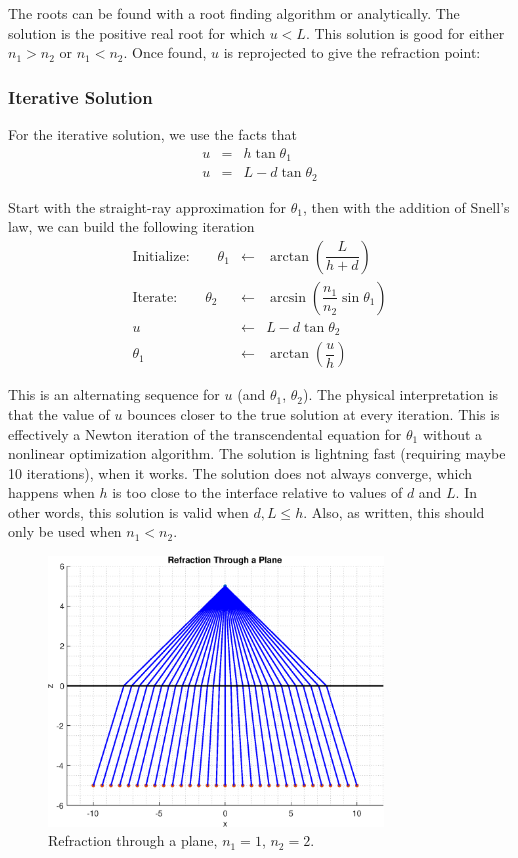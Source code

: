 The roots can be found with a root finding algorithm or analytically. The solution is the positive real root for which $u < L$.  This solution is good for either $n_1 > n_2$ or $n_1 < n_2$. Once found, $u$ is reprojected to give the refraction point: 

\subsubsection{Iterative Solution}
For the iterative solution, we use the facts that  
\begin{eqnarray} 
u &=& h \tan \theta_1 \\
u &=& L - d \tan \theta_2 
\end{eqnarray}

Start with the straight-ray approximation for $\theta_1$, then with the addition of Snell's law, we can build the following iteration
\begin{eqnarray}
\textrm{Initialize:} \quad \quad \theta_1 &\leftarrow &\arctan\left( \dfrac{L}{h + d}\right) \ \nonumber \\
\textrm{Iterate:} \quad \quad\theta_2 &\leftarrow &\arcsin\left(\dfrac{n_1}{n_2} \sin\theta_1\right) \nonumber  \\
u & \leftarrow &L - d \tan\theta_2 \nonumber  \\
\theta_1 &\leftarrow&  \arctan\left( \dfrac{u}{h}\right) \nonumber
\end{eqnarray}

This is an alternating sequence for $u$ (and $\theta_1$, $\theta_2$). The physical interpretation is that the value of $u$ bounces closer to the true solution at every iteration. This is effectively a Newton iteration of the transcendental equation for $\theta_1$ without a nonlinear optimization algorithm. The solution is lightning fast (requiring maybe 10 iterations), when it works. The solution does not always converge, which happens when $h$ is too close to the interface relative to values of $d$ and $L$. In other words, this solution is valid when $d,L \le h$. Also, as written, this should only be used when $n_1 < n_2$.  

\begin{figure}[h] 
   \centering
   \includegraphics[width=3.5in]{ReflectionRefraction/Figures/refractionraysplane} 
   \caption{Refraction through a plane, $n_1 = 1$, $n_2 = 2$.}
\end{figure}

